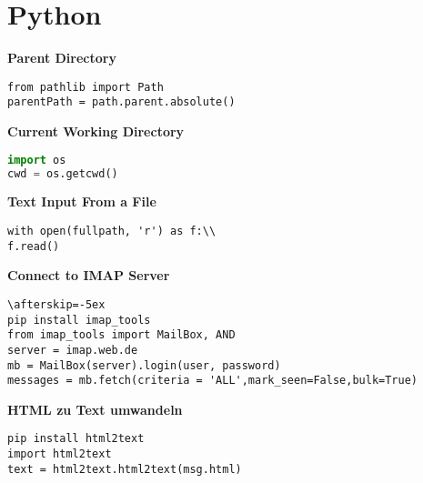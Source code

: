 \chapter{Python}\label{chap:Python}
\textbf{Parent Directory}
\begin{lstlisting}
from pathlib import Path
parentPath = path.parent.absolute()
\end{lstlisting}
\textbf{Current Working Directory}
\begin{lstlisting}[language=Python]
import os
cwd = os.getcwd()
\end{lstlisting}
\textbf{Text Input From a File}
\begin{lstlisting}
with open(fullpath, 'r') as f:\\
f.read()
\end{lstlisting}
\textbf{Connect to IMAP Server}
\begin{lstlisting}
\afterskip=-5ex
pip install imap_tools
from imap_tools import MailBox, AND
server = imap.web.de
mb = MailBox(server).login(user, password)
messages = mb.fetch(criteria = 'ALL',mark_seen=False,bulk=True)
\end{lstlisting}
\textbf{HTML zu Text umwandeln}
\begin{lstlisting}
pip install html2text
import html2text
text = html2text.html2text(msg.html)
\end{lstlisting}